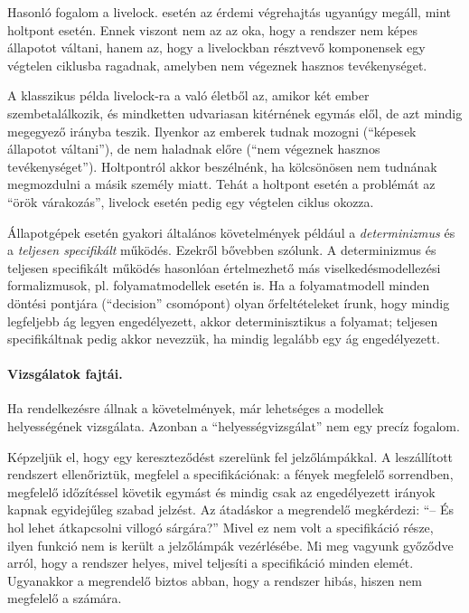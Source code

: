 Hasonló fogalom a livelock.  esetén az érdemi végrehajtás ugyanúgy megáll, mint holtpont esetén. Ennek viszont nem az az oka, hogy a rendszer nem képes állapotot váltani, hanem az, hogy a livelockban résztvevő komponensek egy végtelen ciklusba ragadnak, amelyben nem végeznek hasznos tevékenységet.

\begin{megjegyzes}
A klasszikus példa livelock-ra a való életből az, amikor két ember szembetalálkozik, és mindketten udvariasan kitérnének egymás elől, de azt mindig megegyező irányba teszik. Ilyenkor az emberek tudnak mozogni (``képesek állapotot váltani''), de nem haladnak előre (``nem végeznek hasznos tevékenységet''). Holtpontról akkor beszélnénk, ha kölcsönösen nem tudnának megmozdulni a másik személy miatt. Tehát a holtpont esetén a problémát az ``örök várakozás'', livelock esetén pedig egy végtelen ciklus okozza.
\end{megjegyzes}

Állapotgépek esetén gyakori általános követelmények például a \emph{determinizmus} és a \emph{teljesen specifikált} működés. Ezekről bővebben  szólunk. A determinizmus és teljesen specifikált működés hasonlóan értelmezhető más viselkedésmodellezési formalizmusok, pl. folyamatmodellek esetén is. Ha a folyamatmodell minden döntési pontjára (``decision'' csomópont) olyan őrfeltételeket írunk, hogy mindig legfeljebb ág legyen engedélyezett, akkor determinisztikus a folyamat; teljesen specifikáltnak pedig akkor nevezzük, ha mindig legalább egy ág engedélyezett.

\paragraph{Vizsgálatok fajtái.}
Ha rendelkezésre állnak a követelmények, már lehetséges a modellek helyességének vizsgálata. Azonban a ``helyességvizsgálat'' nem egy precíz fogalom. 

\begin{megjegyzes}
Képzeljük el, hogy egy kereszteződést szerelünk fel jelzőlámpákkal. A leszállított rendszert ellenőriztük, megfelel a specifikációnak: a fények megfelelő sorrendben, megfelelő időzítéssel követik egymást és mindig csak az engedélyezett irányok kapnak egyidejűleg szabad jelzést. Az átadáskor a megrendelő megkérdezi: ``-- És hol lehet átkapcsolni villogó sárgára?'' Mivel ez nem volt a specifikáció része, ilyen funkció nem is került a jelzőlámpák vezérlésébe. Mi meg vagyunk győződve arról, hogy a rendszer helyes, mivel teljesíti a specifikáció minden elemét. Ugyanakkor a megrendelő biztos abban, hogy a rendszer hibás, hiszen nem megfelelő a számára.
\end{megjegyzes}

